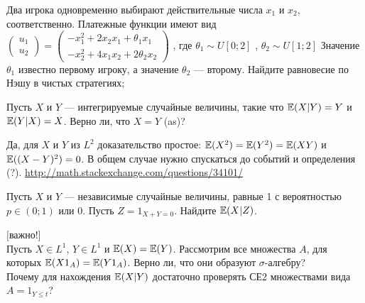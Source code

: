 \begin{solution}
\begin{solution}
\begin{solution}
\begin{solution}
\begin{solution}
\begin{solution}
\begin{solution}
\begin{solution}
\end{solution}

\begin{problem}
Два игрока одновременно выбирают действительные числа  $x_{1} $  и
$x_{2} $, соответственно. Платежные функции имеют вид
 $\left(\begin{array}{l} {u_{1} } \\
 {u_{2} } \end{array}\right)=
 \left(\begin{array}{l} {-x_{1}^{2} +2x_{2} x_{1} +\theta _{1} x_{1} } \\
 {-x_{2}^{2} +4x_{1} x_{2} +2\theta _{2} x_{2} } \end{array}\right)$ ,
 где  $\theta _{1} \sim U\left[0;2\right]$ ,  $\theta _{2} \sim U\left[1;2\right]$
Значение  $\theta _{1} $  известно первому игроку, а значение
$\theta _{2} $  --- второму. Найдите равновесие по Нэшу в чистых
стратегиях; 
\end{problem} 
\begin{solution} 

\end{solution}

\begin{problem}
 Пусть $X$ и $Y$ --- интегрируемые случайные величины, такие что
$\mathbb{E}(X|Y)=Y$ и $\mathbb{E}(Y|X)=X$. Верно ли, что $X=Y$ (as)? 
\end{problem} 
\begin{solution} 
Да, для $X$ и $Y$ из $L^2$ доказательство простое: $\mathbb{E}(X^2)=\mathbb{E}(Y^2)=\mathbb{E}(XY)$ и $\mathbb{E}((X-Y)^2)=0$. В общем случае нужно спускаться до событий и определения (?). 
\url{http://math.stackexchange.com/questions/34101/}

\end{solution}

\begin{problem}
Пусть $X$ и $Y$ --- независимые случайные величины, равные 1 с
вероятностью $p\in(0;1)$ или 0. Пусть $Z=1_{X+Y=0}$. Найдите
$\mathbb{E}(X|Z)$. 
\end{problem} 
\begin{solution} 

\end{solution}

\begin{problem}
 $[$важно!$]$ \\
 Пусть $X\in L^{1}$, $Y\in L^{1}$ и $\mathbb{E}(X)=\mathbb{E}(Y)$.
Рассмотрим все множества $A$, для которых $\mathbb{E}(X 1_{A})=\mathbb{E}(Y 1_{A})$.
Верно ли, что
они образуют $\sigma$-алгебру? \\
Почему для нахождения $\mathbb{E}(X|Y)$ достаточно проверять СЕ2
множествами вида $A=1_{Y\le t}$? 
\end{problem} 
\begin{solution} 


\end{solution}
\end{solution}
\end{solution}
\end{solution}
\end{solution}
\end{solution}
\end{solution}
\end{solution}
